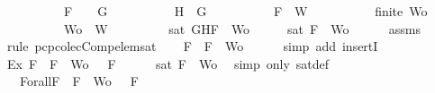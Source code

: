 \begin{isabellebody}
\ \ \ \ \ \ \ \ \ \ {\isachardoublequoteopen}F\ {\isacharequal}\ \isactrlbold {\isasymnot}\ {\isacharparenleft}\isactrlbold {\isasymnot}\ G{\isacharparenright}{\isachardoublequoteclose}\isanewline
\ \ \ \ \ \ \ \ \ \ {\isachardoublequoteopen}H\ {\isacharequal}\ G{\isachardoublequoteclose}\isanewline
\ \ \ \ \ \ \ \ \ \ {\isachardoublequoteopen}F\ {\isasymin}\ W{\isachardoublequoteclose}\isanewline
\ \ \ \ \ \ \ \ \ \ {\isachardoublequoteopen}finite\ Wo{\isachardoublequoteclose}\isanewline
\ \ \ \ \ \ \ \ \ \ {\isachardoublequoteopen}Wo\ {\isasymsubseteq}\ W{\isachardoublequoteclose}\isanewline
\ \ \ \ \ \ \ \ \ {\isachardoublequoteopen}sat\ {\isacharparenleft}{\isacharbraceleft}G{\isacharcomma}H{\isacharcomma}F{\isacharbraceright}\ {\isasymunion}\ Wo{\isacharparenright}{\isachardoublequoteclose}\isanewline
%
\isadelimproof
%
\endisadelimproof
%
\isatagproof
{}\isamarkupfalse%
\ {\isacharminus}\isanewline
\ \ \isamarkupfalse%
\ {\isachardoublequoteopen}sat\ {\isacharparenleft}{\isacharbraceleft}F{\isacharbraceright}\ {\isasymunion}\ Wo{\isacharparenright}{\isachardoublequoteclose}\isanewline
\ \ \ \ \isamarkupfalse%
\ assms{\isacharparenleft}{}{\isacharcomma}{}{\isacharcomma}{}{\isacharcomma}{}{\isacharparenright}\ \isamarkupfalse%
\ {\isacharparenleft}rule\ pcp{\isacharunderscore}colecComp{\isacharunderscore}elem{\isacharunderscore}sat{\isacharparenright}\isanewline
\ \ \isamarkupfalse%
\ {\isachardoublequoteopen}F\ {\isasymin}\ {\isacharbraceleft}F{\isacharbraceright}\ {\isasymunion}\ Wo{\isachardoublequoteclose}\isanewline
\ \ \ \ \isamarkupfalse%
\ {\isacharparenleft}simp\ add{\isacharcolon}\ insertI{}{\isacharparenright}\isanewline
\ \ \isamarkupfalse%
\ Ex{}{\isacharcolon}{\isachardoublequoteopen}{\isasymexists}{\isasymA}{\isachardot}\ {\isasymforall}F\ {\isasymin}\ {\isacharparenleft}{\isacharbraceleft}F{\isacharbraceright}\ {\isasymunion}\ Wo{\isacharparenright}{\isachardot}\ {\isasymA}\ {\isasymTurnstile}\ F{\isachardoublequoteclose}\isanewline
\ \ \ \ \isamarkupfalse%
\ {\isacartoucheopen}sat\ {\isacharparenleft}{\isacharbraceleft}F{\isacharbraceright}\ {\isasymunion}\ Wo{\isacharparenright}{\isacartoucheclose}\ \isamarkupfalse%
\ {\isacharparenleft}simp\ only{\isacharcolon}\ sat{\isacharunderscore}def{\isacharparenright}\isanewline
\ \ \isamarkupfalse%
\ {\isasymA}\ \ Forall{}{\isacharcolon}{\isachardoublequoteopen}{\isasymforall}F\ {\isasymin}\ {\isacharparenleft}{\isacharbraceleft}F{\isacharbraceright}\ {\isasymunion}\ Wo{\isacharparenright}{\isachardot}\ {\isasymA}\ {\isasymTurnstile}\ F{\isachardoublequoteclose}\isanewline

\end{isabellebody}
